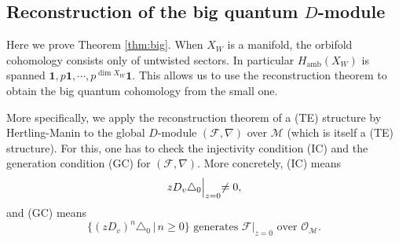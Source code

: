 \documentclass[11pt]{amsart}
\theoremstyle{definition} %
\theoremstyle{remark} %
\newcommand{\cO}{\mathcal{O}}
\newcommand{\cM}{\mathcal{M}}
\newcommand{\cF}{\mathcal{F}}
\newcommand{\unit}{\boldsymbol{1}}
\newcommand{\amb}{\operatorname{amb}}
\begin{document}
\subsection{Reconstruction of the big quantum $D$-module} 
\label{subsec:reconstruction}  
Here we prove Theorem \ref{thm:big}. 
When $X_W$ is a manifold, the orbifold cohomology 
consists only of untwisted sectors. In particular 
$H_{\amb}(X_W)$ is spanned 
$\unit, p \unit, \cdots, p^{\dim X_W} \unit$. 
This allows us to use the reconstruction theorem 
\cite{Kontsevich-Manin, Hertling-Manin, Iritani:genmir, 
Rose, Reichelt} to obtain the big quantum cohomology 
from the small one. 

More specifically, we apply the reconstruction theorem of 
a (TE) structure by Hertling-Manin \cite[Theorem 2.5]{Hertling-Manin} 
to the global $D$-module $(\cF,\nabla)$ over $\cM$ 
(which is itself a (TE) structure). 
For this, one has to check the injectivity condition (IC) and 
the generation condition (GC) for $(\cF,\nabla)$. 
More concretely, (IC) means  
\[
z D_v \triangle_0\Bigl |_{z =0} \neq 0,  
\]
and (GC) means 
\[
\{(z D_v)^n \triangle_0 \, |\, n \ge 0\}  
\text{ generates } \cF|_{z=0} \text{ over } \cO_\cM. 
\]
\end{document}

